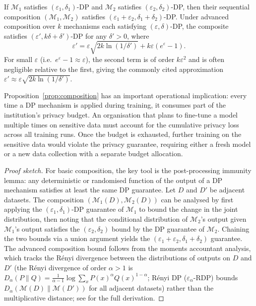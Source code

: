 \begin{proposition}
\label{prop:composition}
If $\mathcal{M}_1$ satisfies $(\varepsilon_1, \delta_1)$-DP and $\mathcal{M}_2$ satisfies $(\varepsilon_2, \delta_2)$-DP, then their sequential composition $(\mathcal{M}_1, \mathcal{M}_2)$ satisfies $(\varepsilon_1 + \varepsilon_2, \delta_1 + \delta_2)$-DP. Under advanced composition over $k$ mechanisms each satisfying $(\varepsilon, \delta)$-DP, the composite satisfies $(\varepsilon', k\delta + \delta')$-DP for any $\delta' > 0$, where
\begin{equation}
  \label{eq:ch15-advanced-comp}
  \varepsilon' = \varepsilon\sqrt{2k \ln(1/\delta')} + k\varepsilon(e^{\varepsilon} - 1).
\end{equation}
For small $\varepsilon$ (i.e.\ $e^{\varepsilon} - 1 \approx \varepsilon$), the second term is of order $k\varepsilon^2$ and is often negligible relative to the first, giving the commonly cited approximation $\varepsilon' \approx \varepsilon\sqrt{2k\ln(1/\delta')}$.
\end{proposition}

Proposition~\ref{prop:composition} has an important operational implication: every time a DP mechanism is applied during training, it consumes part of the institution's privacy budget. An organisation that plans to fine-tune a model multiple times on sensitive data must account for the cumulative privacy loss across all training runs. Once the budget is exhausted, further training on the sensitive data would violate the privacy guarantee, requiring either a fresh model or a new data collection with a separate budget allocation.

\begin{proof}[Proof sketch]
For basic composition, the key tool is the post-processing immunity lemma: any deterministic or randomised function of the output of a DP mechanism satisfies at least the same DP guarantee. Let $D$ and $D'$ be adjacent datasets. The composition $(\mathcal{M}_1(D), \mathcal{M}_2(D))$ can be analysed by first applying the $(\varepsilon_1, \delta_1)$-DP guarantee of $\mathcal{M}_1$ to bound the change in the joint distribution, then noting that the conditional distribution of $\mathcal{M}_2$'s output given $\mathcal{M}_1$'s output satisfies the $(\varepsilon_2, \delta_2)$ bound by the DP guarantee of $\mathcal{M}_2$. Chaining the two bounds via a union argument yields the $(\varepsilon_1 + \varepsilon_2, \delta_1 + \delta_2)$ guarantee. The advanced composition bound follows from the moments accountant analysis, which tracks the R\'enyi divergence between the distributions of outputs on $D$ and $D'$ (the Rényi divergence of order $\alpha > 1$ is $D_\alpha(P\|Q) = \frac{1}{\alpha-1}\log\sum_x P(x)^\alpha Q(x)^{1-\alpha}$; Rényi DP ($\varepsilon_\alpha$-RDP) bounds $D_\alpha(\mathcal{M}(D)\|\mathcal{M}(D'))$ for all adjacent datasets) rather than the multiplicative distance; see \citet{dwork2014algorithmic} for the full derivation.
\end{proof}

